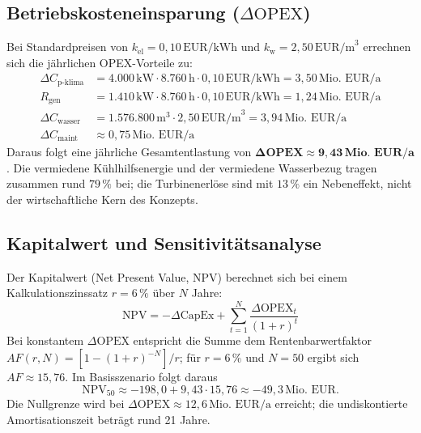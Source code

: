\documentclass[journal]{IEEEtran}
\begin{document}
\subsection{Betriebskosteneinsparung ($\Delta\text{OPEX}$)}
Bei Standardpreisen von $k_{\text{el}} = 0{,}10\,\text{EUR/kWh}$ und $k_{\text{w}} = 2{,}50\,\text{EUR/m}^3$ errechnen sich die jährlichen OPEX-Vorteile zu:
\begin{align}
\Delta C_{\text{p-klima}} &= 4.000\,\text{kW} \cdot 8.760\,\text{h} \cdot 0{,}10\,\text{EUR/kWh} = 3{,}50\,\text{Mio. EUR/a} \\
R_{\text{gen}} &= 1.410\,\text{kW} \cdot 8.760\,\text{h} \cdot 0{,}10\,\text{EUR/kWh} = 1{,}24\,\text{Mio. EUR/a} \\
\Delta C_{\text{wasser}} &= 1.576.800\,\text{m}^3 \cdot 2{,}50\,\text{EUR/m}^3 = 3{,}94\,\text{Mio. EUR/a} \\
\Delta C_{\text{maint}} &\approx 0{,}75\,\text{Mio. EUR/a}
\end{align}
Daraus folgt eine jährliche Gesamtentlastung von $\mathbf{\Delta\text{OPEX} \approx 9{,}43\,\text{Mio. EUR/a}}$. Die vermiedene Kühlhilfsenergie und der vermiedene Wasserbezug tragen zusammen rund $79\,\%$ bei; die Turbinenerlöse sind mit $13\,\%$ ein Nebeneffekt, nicht der wirtschaftliche Kern des Konzepts.

\subsection{Kapitalwert und Sensitivitätsanalyse}
Der Kapitalwert (Net Present Value, NPV) berechnet sich bei einem Kalkulationszinssatz $r = 6\,\%$ über $N$ Jahre:
\begin{equation}
\text{NPV} = -\Delta\text{CapEx} + \sum_{t=1}^N \frac{\Delta\text{OPEX}_t}{(1 + r)^t}
\end{equation}
Bei konstantem $\Delta\text{OPEX}$ entspricht die Summe dem Rentenbarwertfaktor $AF(r,N) = \left[1-(1+r)^{-N}\right]/r$; für $r = 6\,\%$ und $N = 50$ ergibt sich $AF \approx 15{,}76$. Im Basisszenario folgt daraus
\begin{equation}
\text{NPV}_{50} \approx -198{,}0 + 9{,}43 \cdot 15{,}76 \approx -49{,}3\,\text{Mio. EUR}.
\end{equation}
Die Nullgrenze wird bei $\Delta\text{OPEX} \approx 12{,}6\,\text{Mio. EUR/a}$ erreicht; die undiskontierte Amortisationszeit beträgt rund 21 Jahre.
\end{document}
